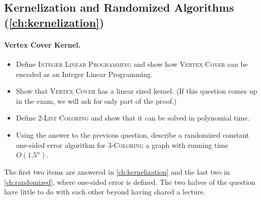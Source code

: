 \subsection*{Kernelization and Randomized Algorithms (\cref{ch:kernelization})}

\paragraph{Vertex Cover Kernel.}
\begin{itemize}
  \item Define \textsc{Integer Linear Programming} and show how \textsc{Vertex
        Cover} can be encoded as an Integer Linear Programming.
  \item Show that \textsc{Vertex Cover} has a linear sized kernel. (If this
        question comes up in the exam, we will ask for only part of the proof.)
  \item Define \textsc{2-List Coloring} and show that it can be solved in
        polynomial time.
  \item Using the answer to the previous question, describe a randomized constant
        one-sided error algorithm for \textsc{3-Coloring} a graph with running
        time $O(1.5^n)$.
\end{itemize}

\begin{remark}
The first two items are answered in \cref{ch:kernelization} and the last two in
\cref{ch:randomized}, where one-sided error is defined. The two halves of the
question have little to do with each other beyond having shared a lecture.
\end{remark}

